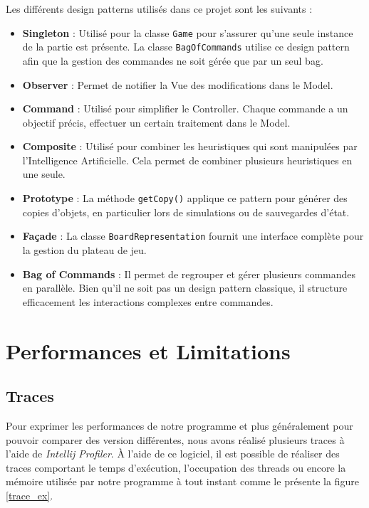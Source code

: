 \documentclass{article}
\begin{document}
Les différents design patterns utilisés dans ce projet sont les suivants :
\begin{itemize}
    \item \textbf{Singleton} : Utilisé pour la classe \texttt{Game} pour s'assurer qu'une seule instance de la partie est présente.
    La classe \texttt{BagOfCommands} utilise ce design pattern afin que la gestion des commandes ne soit gérée que par un seul bag.
    \item \textbf{Observer} : Permet de notifier la Vue des modifications dans le Model.
    \item \textbf{Command} : Utilisé pour simplifier le Controller. Chaque commande a un objectif précis, effectuer un certain traitement dans le Model.
    \item \textbf{Composite} : Utilisé pour combiner les heuristiques qui sont manipulées par l'Intelligence Artificielle. Cela permet de combiner plusieurs heuristiques en une seule.
    \item \textbf{Prototype} : La méthode \texttt{getCopy()} applique ce pattern pour générer des copies d’objets, en particulier lors de simulations ou de sauvegardes d’état.
    \item \textbf{Façade} : La classe \texttt{BoardRepresentation} fournit une interface complète pour la gestion du plateau de jeu.
    \item \textbf{Bag of Commands} : Il permet de regrouper
    et gérer plusieurs commandes en parallèle. Bien qu’il ne soit pas un design pattern
    classique, il structure efficacement les interactions complexes entre commandes.
\end{itemize}


\section{Performances et Limitations}
\subsection{Traces}
Pour exprimer les performances de notre programme et plus généralement pour pouvoir comparer des version différentes, nous avons réalisé plusieurs
traces à l'aide de \textit{Intellij Profiler}. À l'aide de ce logiciel, il est possible de réaliser des traces comportant le temps d'exécution, l'occupation des threads
ou encore la mémoire utilisée par notre programme à tout instant comme le présente la figure \ref{trace_ex}.
\end{document}
